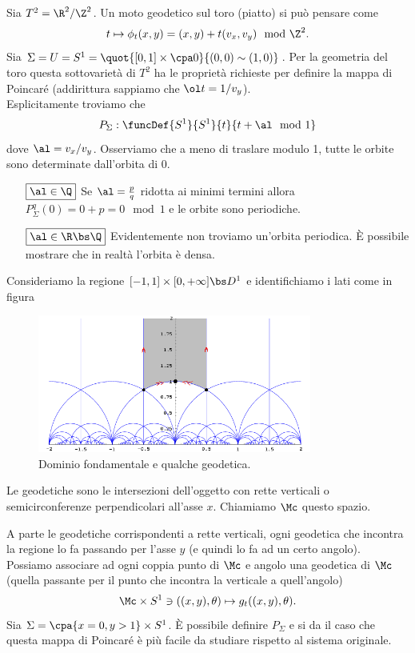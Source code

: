 \begin{example}
Sia $T^2=\R^2/\Z^2$. Un moto geodetico sul toro (piatto) si pu\`o pensare come
\[t\mapsto \phi_t(x,y)=(x,y)+t(v_x,v_y)\mod{\Z^2}.\]
Sia $\Sigma=U=S^1=\quot{[0,1]\times\cpa0}{(0,0)\sim(1,0)}$. Per la geometria del toro questa sottovariet\`a di $T^2$ ha le propriet\`a richieste per definire la mappa di Poincar\'e (addirittura sappiamo che $\ol t=1/v_y$).\\
Esplicitamente troviamo che 
\[P_\Sigma:\funcDef{S^1}{S^1}{t}{t+\al \mod 1}\]
dove $\al=v_x/v_y$. Osserviamo che a meno di traslare modulo 1, tutte le orbite sono determinate dall'orbita di $0$.
\setlength{\leftmargini}{0cm}
\begin{itemize}
\item[$\boxed{\al\in\Q}$] Se $\al=\frac pq$ ridotta ai minimi termini allora $P_\Sigma^q(0)=0+p=0 \mod 1$ e le orbite sono periodiche.
\item[$\boxed{\al\in\R\bs\Q}$] Evidentemente non troviamo un'orbita periodica. \`E possibile mostrare che in realt\`a l'orbita \`e densa.
\end{itemize}
\setlength{\leftmargini}{0.5cm}
\end{example}


\begin{definition}
Consideriamo la regione $[-1,1]\times [0,+\infty]\bs D^1$ e identifichiamo i lati come in figura
\begin{figure}[!htb]
    \centering
    \includegraphics[width=9cm]{Immagini/ModularGroup-FundamentalDomain-01.png}
    \caption{Dominio fondamentale e qualche geodetica.}
    \label{SemipianoPoincare}
\end{figure}

\noindent
Le geodetiche sono le intersezioni dell'oggetto con rette verticali o semicirconferenze perpendicolari all'asse $x$.
Chiamiamo $\Mc$ questo spazio.
\end{definition}
\begin{example}
A parte le geodetiche corrispondenti a rette verticali, ogni geodetica che incontra la regione lo fa passando per l'asse $y$ (e quindi lo fa ad un certo angolo). Possiamo associare ad ogni coppia punto di $\Mc$ e angolo una geodetica di $\Mc$ (quella passante per il punto che incontra la verticale a quell'angolo)
\[\Mc\times S^1\ni ((x,y),\theta)\mapsto g_t((x,y),\theta).\]
Sia $\Sigma=\cpa{x=0,y>1}\times S^1$. \`E possibile definire $P_\Sigma$ e si da il caso che questa mappa di Poincar\'e \`e pi\`u facile da studiare rispetto al sistema originale.
\end{example}

